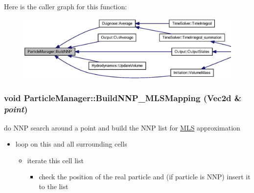 Here is the caller graph for this function:\nopagebreak
\begin{figure}[H]
\begin{center}
\leavevmode
\includegraphics[width=328pt]{classParticleManager_4e0f9e5cb222739a83f0f80ee4ba265b_icgraph}
\end{center}
\end{figure}
\hypertarget{classParticleManager_b68ab55a9429ac8d32368b531487dcec}{
\subsubsection[{BuildNNP\_\-MLSMapping}]{\setlength{\rightskip}{0pt plus 5cm}void ParticleManager::BuildNNP\_\-MLSMapping (Vec2d \& {\em point})}}
\label{classParticleManager_b68ab55a9429ac8d32368b531487dcec}


do NNP search around a point and build the NNP list for \hyperlink{classMLS}{MLS} approximation 



\begin{itemize}
\item loop on this and all surrounding cells

\begin{itemize}
\item iterate this cell list

\begin{itemize}
\item check the position of the real particle and (if particle is NNP) insert it to the list \end{itemize}
\end{itemize}
\end{itemize}



